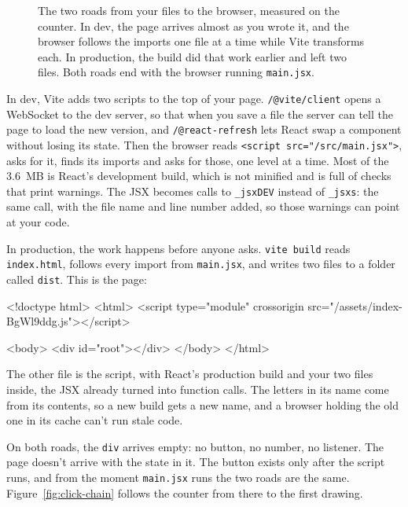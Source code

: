 \begin{figure}[htbp]
\caption{The two roads from your files to the browser, measured on the counter.
In dev, the page arrives almost as you wrote it, and the browser follows the
imports one file at a time while Vite transforms each. In production, the build
did that work earlier and left two files. Both roads end with the browser
running \texttt{main.jsx}.}
\label{fig:two-roads}
\end{figure}

In dev, Vite adds two scripts to the top of your page. \texttt{/@vite/client}
opens a WebSocket to the dev server, so that when you save a file the server
can tell the page to load the new version, and \texttt{/@react-refresh} lets
React swap a component without losing its state. Then the browser reads
\texttt{<script src="/src/main.jsx">}, asks for it, finds its imports and asks
for those, one level at a time. Most of the 3.6~MB is React's development
build, which is not minified and is full of checks that print warnings. The
JSX becomes calls to \texttt{\_jsxDEV} instead of \texttt{\_jsxs}: the same
call, with the file name and line number added, so those warnings can point at
your code.

In production, the work happens before anyone asks. \texttt{vite build} reads
\texttt{index.html}, follows every import from \texttt{main.jsx}, and writes
two files to a folder called \texttt{dist}. This is the page:

\begin{code}[language={},morestring={[b]"}]
<!doctype html>
<html>
  <script type="module" crossorigin src="/assets/index-BgWl9ddg.js"></script>

  <body>
    <div id="root"></div>
  </body>
</html>
\end{code}

The other file is the script, with React's production build and your two files
inside, the JSX already turned into function calls. The letters in its name
come from its contents, so a new build gets a new name, and a browser holding
the old one in its cache can't run stale code.

On both roads, the \texttt{div} arrives empty: no button, no number, no
listener. The page doesn't arrive with the state in it. The button exists only
after the script runs, and from the moment \texttt{main.jsx} runs the two roads
are the same. Figure~\ref{fig:click-chain} follows the counter from there to
the first drawing.

